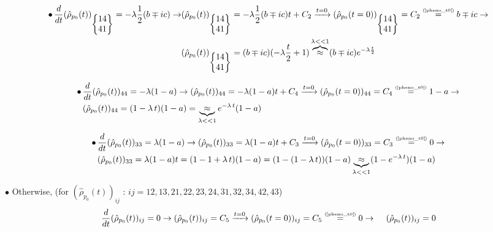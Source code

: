 \documentclass[11pt]{article}
\numberwithin{equation}{section} %
\numberwithin{figure}{section} %
\newcommand\numeq[1] %
  {\stackrel{\scriptscriptstyle(\mkern-1.5mu#1\mkern-1.5mu)}{=}}
\begin{document}
\begin{appendices}
\begin{equation} 
\begin{split}
\bullet\,\frac{d}{dt}(\hat{\rho}_{p_0}(t))_{\begin{Bmatrix}14\\41\end{Bmatrix}}=-\lambda\frac{1}{2}(b\mp ic)\rightarrow
&(\hat{\rho}_{p_0}(t))_{\begin{Bmatrix}14\\41\end{Bmatrix}}=-\lambda\frac{1}{2}(b\mp ic)t+C_2 \xrightarrow{t=0} (\hat{\rho}_{p_0}(t=0))_{\begin{Bmatrix}14\\41\end{Bmatrix}}=C_2\numeq{\textrm{\ref{pheno_t0}}}b\mp ic\rightarrow\\
&(\hat{\rho}_{p_0}(t))_{\begin{Bmatrix}14\\41\end{Bmatrix}}=(b\mp ic)(-\lambda\frac{t}{2}+1)\overbrace{\approx}^{\lambda<<1}(b\mp ic)e^{-\lambda\frac{t}{2}}
\end{split}
\end{equation}

\begin{equation} 
\begin{split}
\bullet\,
&\frac{d}{dt}(\hat{\rho}_{p_0}(t))_{44}=-\lambda(1-a)\rightarrow(\hat{\rho}_{p_0}(t))_{44}=-\lambda(1-a)t+C_4 \xrightarrow{t=0} (\hat{\rho}_{p_0}(t=0))_{44}=C_4\numeq{\textrm{\ref{pheno_t0}}}1-a\rightarrow\\
&(\hat{\rho}_{p_0}(t))_{44}=(1-\lambda\,t)(1-a)=\underbrace{\approx}_{\lambda<<1}e^{-\lambda\,t}(1-a)
\end{split}
\end{equation}

\begin{equation} 
\begin{split}
\bullet\,
&\frac{d}{dt}(\hat{\rho}_{p_0}(t))_{33}=\lambda(1-a)\rightarrow(\hat{\rho}_{p_0}(t))_{33}=\lambda(1-a)t+C_3 \xrightarrow{t=0} (\hat{\rho}_{p_0}(t=0))_{33}=C_3\numeq{\textrm{\ref{pheno_t0}}}0\rightarrow\\
&(\hat{\rho}_{p_0}(t))_{33}=\lambda(1-a)t=(1-1+\lambda\,t)(1-a)=(1-(1-\lambda\,t))(1-a)\underbrace{\approx}_{\lambda<<1}(1-e^{-\lambda\,t})(1-a)
\end{split}
\end{equation}


$\bullet$ Otherwise, (for $(\hat{\rho}_{p_0}(t))_{ij}$ : $ij=12,13,21,22,23,24,31,32,34,42,43$)
\begin{equation} \label{rho_otherwise}
\frac{d}{dt}(\hat{\rho}_{p_0}(t))_{ij}=0\rightarrow(\hat{\rho}_{p_0}(t))_{ij}=C_5 \xrightarrow{t=0} (\hat{\rho}_{p_0}(t=0))_{ij}=C_5\numeq{\textrm{\ref{pheno_t0}}}0\rightarrow\,\,\,\,\,\,\,(\hat{\rho}_{p_0}(t))_{ij}=0
\end{equation}



\end{appendices}
\end{document}
